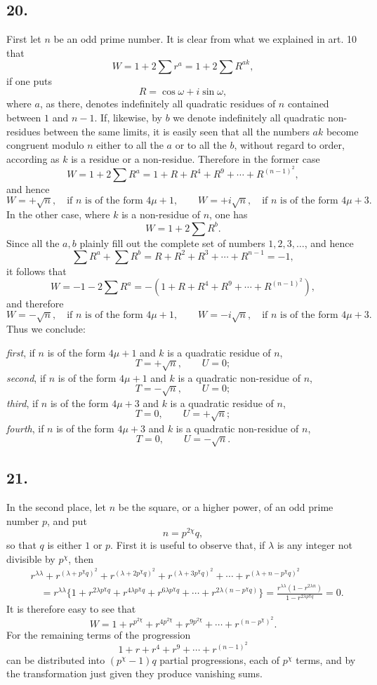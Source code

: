\documentclass[12pt]{article}
\begin{document}
\subsection*{20.}

First let $n$ be an odd prime number. It is clear from what we explained in art. 10 that
\[
W=1+2\sum r^a=1+2\sum R^{ak},
\]
if one puts
\[
R=\cos\omega+i\sin\omega,
\]
where $a$, as there, denotes indefinitely all quadratic residues of $n$ contained between $1$ and $n-1$. If, likewise, by $b$ we denote indefinitely all quadratic non-residues between the same limits, it is easily seen that all the numbers $ak$ become congruent modulo $n$ either to all the $a$ or to all the $b$, without regard to order, according as $k$ is a residue or a non-residue. Therefore in the former case
\[
W=1+2\sum R^a=1+R+R^4+R^9+\cdots+R^{(n-1)^2},
\]
and hence
\[
W=+\sqrt n,\quad\text{if }n\text{ is of the form }4\mu+1,\qquad
W=+i\sqrt n,\quad\text{if }n\text{ is of the form }4\mu+3.
\]
In the other case, where $k$ is a non-residue of $n$, one has
\[
W=1+2\sum R^b.
\]
Since all the $a,b$ plainly fill out the complete set of numbers $1,2,3,\ldots$, and hence
\[
\sum R^a+\sum R^b=R+R^2+R^3+\cdots+R^{n-1}=-1,
\]
it follows that
\[
W=-1-2\sum R^a=-(1+R+R^4+R^9+\cdots+R^{(n-1)^2}),
\]
and therefore
\[
W=-\sqrt n,\quad\text{if }n\text{ is of the form }4\mu+1,\qquad
W=-i\sqrt n,\quad\text{if }n\text{ is of the form }4\mu+3.
\]
Thus we conclude:

\emph{first}, if $n$ is of the form $4\mu+1$ and $k$ is a quadratic residue of $n$,
\[
T=+\sqrt n,\qquad U=0;
\]
\emph{second}, if $n$ is of the form $4\mu+1$ and $k$ is a quadratic non-residue of $n$,
\[
T=-\sqrt n,\qquad U=0;
\]
\emph{third}, if $n$ is of the form $4\mu+3$ and $k$ is a quadratic residue of $n$,
\[
T=0,\qquad U=+\sqrt n;
\]
\emph{fourth}, if $n$ is of the form $4\mu+3$ and $k$ is a quadratic non-residue of $n$,
\[
T=0,\qquad U=-\sqrt n.
\]



\subsection*{21.}

In the second place, let $n$ be the square, or a higher power, of an odd prime number $p$, and put
\[
n=p^{2\chi}q,
\]
so that $q$ is either $1$ or $p$. First it is useful to observe that, if $\lambda$ is any integer not divisible by $p^\chi$, then
\[
\begin{aligned}
&r^{\lambda\lambda}+r^{(\lambda+p^\chi q)^2}+r^{(\lambda+2p^\chi q)^2}
+r^{(\lambda+3p^\chi q)^2}+\cdots+r^{(\lambda+n-p^\chi q)^2}\\
&\quad
=r^{\lambda\lambda}\{1+r^{2\lambda p^\chi q}+r^{4\lambda p^\chi q}
+r^{6\lambda p^\chi q}+\cdots+r^{2\lambda(n-p^\chi q)}\}
=\frac{r^{\lambda\lambda}(1-r^{2\lambda n})}{1-r^{2\lambda p^\chi q}}=0.
\end{aligned}
\]
It is therefore easy to see that
\[
W=1+r^{p^{2\chi}}+r^{4p^{2\chi}}+r^{9p^{2\chi}}+\cdots+r^{(n-p^\chi)^2}.
\]
For the remaining terms of the progression
\[
1+r+r^4+r^9+\cdots+r^{(n-1)^2}
\]
can be distributed into $(p^\chi-1)q$ partial progressions, each of $p^\chi$ terms, and by the transformation just given they produce vanishing sums.
\end{document}
